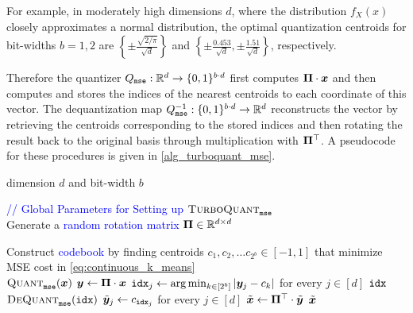 \documentclass[11pt]{article}
\newcommand{\TurboQuant}{\textsc{TurboQuant}\xspace}
\begin{document}
For example, in moderately high dimensions $d$, where the distribution $f_X(x)$ closely approximates a normal distribution, the optimal quantization centroids for bit-widths $b = 1, 2$ are $\left\{ \pm \frac{\sqrt{2/\pi}}{\sqrt{d}} \right\}$ and $\left\{ \pm \frac{0.453}{\sqrt{d}}, \pm \frac{1.51}{\sqrt{d}} \right\}$, respectively.

Therefore the quantizer $Q_{\tt mse}: \mathbb{R}^d \to \{ 0, 1 \}^{b \cdot d}$ first computes $\boldsymbol{\Pi} \cdot {\bm x}$ and then computes and stores the indices of the nearest centroids to each coordinate of this vector.
The dequantization map $Q_{\tt mse}^{-1}: \{ 0, 1 \}^{b \cdot d} \to \mathbb{R}^d$ reconstructs the vector by retrieving the centroids corresponding to the stored indices and then rotating the result back to the original basis through multiplication with $\boldsymbol{\Pi}^\top$.
A pseudocode for these procedures is given in \cref{alg_turboquant_mse}.


\begin{algorithm}[t!]
\caption{$\TurboQuant_{\tt mse}$: optimized for MSE}\label{alg_turboquant_mse}
\begin{algorithmic}[1]
     dimension $d$ and bit-width $b$

    {\ttfamily\textcolor{blue}{// Global Parameters for Setting up $\TurboQuant_{\tt mse}$}} \\
    \STATE Generate a {\ttfamily\textcolor{blue}{random rotation matrix}} $\boldsymbol{\Pi} \in \mathbb{R}^{d \times d}$

    \STATE Construct {\ttfamily\textcolor{blue}{codebook}} by finding centroids $c_1, c_2, \ldots c_{2^b} \in [-1, 1]$ that minimize MSE cost in \cref{eq:continuous_k_means} \label{alg:codebook_construction}
   \\\hrulefill
    $\textsc{Quant}_{\tt mse} ( {\bm x} )$
   \STATE ${\bm y} \gets \boldsymbol{\Pi} \cdot {\bm x}$\label{line_y}
   \STATE ${\tt idx}_j \gets \arg\min_{k \in [2^b]}  \left |{\bm y}_j - c_k\right|$ for every $j \in [d]$\label{line_idx} \hfill {}
    ${\tt idx}$
   \\\hrulefill
    $\textsc{DeQuant}_{\tt mse} ({\tt idx})$
   \STATE $\tilde{{\bm y}}_j \gets c_{{\tt idx}_j}$ for every $j \in [d]$\label{y_tilde}
   \STATE $\tilde{{\bm x}} \gets \boldsymbol{\Pi}^\top \cdot \tilde{{\bm y}}$
   $\tilde{{\bm x}}$ 
\end{algorithmic}
\end{algorithm}
\end{document}
